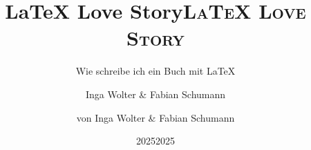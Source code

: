 \documentclass[a5paper 	%
,DIV=13		%
,twoside		%
,11pt %
,headsepline	%
]{scrbook}
\begin{document}
	

\ifdefined\HCode
        \title{LaTeX Love Story}
        \author{Inga Wolter \& Fabian Schumann}
        \date{2025}
        \maketitle
\else
        \begin{titlepage}
                \subject{}
                \title{\Huge \textsc{LaTeX Love Story}}
                \subtitle{Wie schreibe ich ein Buch mit \LaTeX{}}
                \author{von Inga Wolter \& Fabian Schumann}
                \date{2025}
        \end{titlepage}
        \maketitle
\fi
\onehalfspacing %

\frontmatter %

\tableofcontents

\mainmatter %




\end{document}
